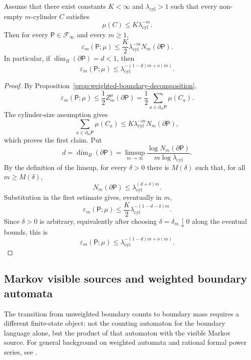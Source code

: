 \begin{theorem}
\label{thm:clarity-boundary-dimension}
Assume that there exist constants \(K<\infty\) and
\(\lambda_{\mathrm{cyl}}>1\) such that every non-empty \(m\)-cylinder
\(C\) satisfies
\[
  \mu(C)\leq K\lambda_{\mathrm{cyl}}^{-m}.
\]
Then for every \(\mathsf{P}\in\mathcal{F}_\infty\) and every \(m\geq 1\),
\[
  \varepsilon_m(\mathsf{P};\mu)
  \leq \frac{K}{2}\lambda_{\mathrm{cyl}}^{-m}
     N_m(\partial\mathsf{P}).
\]
In particular, if
\(\overline{\dim}_B(\partial\mathsf{P})=d<1\), then
\[
  \varepsilon_m(\mathsf{P};\mu)
  \leq \lambda_{\mathrm{cyl}}^{-(1-d)m+o(m)}.
\]
\end{theorem}

\begin{proof}
By Proposition~\ref{prop:weighted-boundary-decomposition},
\[
  \varepsilon_m(\mathsf{P};\mu)
  \leq \frac12 Z_m^\mu(\partial\mathsf{P})
  = \frac12\sum_{a\in\partial_m\mathsf{P}}\mu(C_a).
\]
The cylinder-size assumption gives
\[
  \sum_{a\in\partial_m\mathsf{P}}\mu(C_a)
  \leq K\lambda_{\mathrm{cyl}}^{-m}N_m(\partial\mathsf{P}),
\]
which proves the first claim.  Put
\[
  d=\overline{\dim}_B(\partial\mathsf{P})
  =
  \limsup_{m\to\infty}
  \frac{\log N_m(\partial\mathsf{P})}
       {m\log\lambda_{\mathrm{cyl}}}.
\]
By the definition of the limsup, for every \(\delta>0\) there is
\(M(\delta)\) such that, for all \(m\geq M(\delta)\),
\[
  N_m(\partial\mathsf{P})
  \leq
  \lambda_{\mathrm{cyl}}^{(d+\delta)m}.
\]
Substitution in the first estimate gives, eventually in \(m\),
\[
  \varepsilon_m(\mathsf{P};\mu)
  \leq
  \frac K2\lambda_{\mathrm{cyl}}^{-(1-d-\delta)m}.
\]
Since \(\delta>0\) is arbitrary, equivalently after choosing
\(\delta=\delta_m\downarrow0\) along the eventual bounds, this is
\[
  \varepsilon_m(\mathsf{P};\mu)
  \leq
  \lambda_{\mathrm{cyl}}^{-(1-d)m+o(m)}.
\]
\end{proof}

\subsection{Markov visible sources and weighted boundary automata}

The transition from unweighted boundary counts to boundary mass requires a different finite-state object: not the counting automaton for the
boundary language alone, but the product of that automaton with the
visible Markov source.  For general background on weighted automata and
rational formal power series, see \citet{Sakarovitch2009}.


